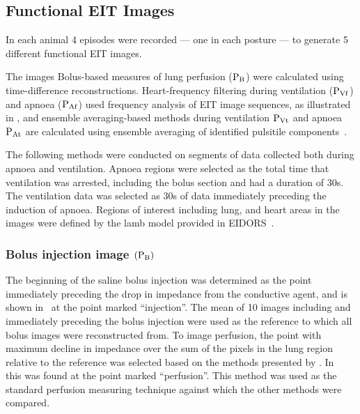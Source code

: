 \subsection{Functional EIT Images}

In each animal 4 episodes were recorded --- one in each posture --- to generate 5
different functional EIT images. 

The images
Bolus-based measures of lung perfusion (${\rm P_{B}}$) were
calculated using time-difference
reconstructions. Heart-frequency filtering during ventilation (${\rm P_{Vf}}$) and
apnoea (${\rm P_{Af}}$) used
frequency analysis of EIT image sequences, as 
illustrated in , and ensemble averaging-based methods during ventilation
${\rm P_{Vt}}$ and apnoea ${\rm P_{At}}$ are 
calculated using ensemble averaging of identified pulsitile components~.

The following methods were conducted on segments of data collected both during apnoea and ventilation. 
Apnoea regions were selected as the total time that ventilation was arrested, including the bolus section
and had a duration of 30s. The ventilation data was selected as 30s of data immediately preceding the 
induction of apnoea.
Regions of interest including lung, and heart areas in the images were defined by the lamb model
provided in EIDORS~\parencite{adler_eidors_2017}.

\subsubsection{Bolus injection image $({\rm P_{B}})$}

The beginning of the saline bolus injection was determined as the point
immediately preceding the drop in impedance from the conductive agent, and is
shown in~ at the point marked ``injection''.
The mean of 10 images including and immediately preceding the bolus injection were used 
as the reference to which all bolus images were reconstructed from. 
To image perfusion, the point with maximum decline in impedance over 
the sum of the pixels in the lung region relative to the reference was selected based on the methods 
presented by .
In~ this was found at the point marked ``perfusion''. 
This method was used as the standard perfusion 
measuring technique
against which the other methods were compared.

